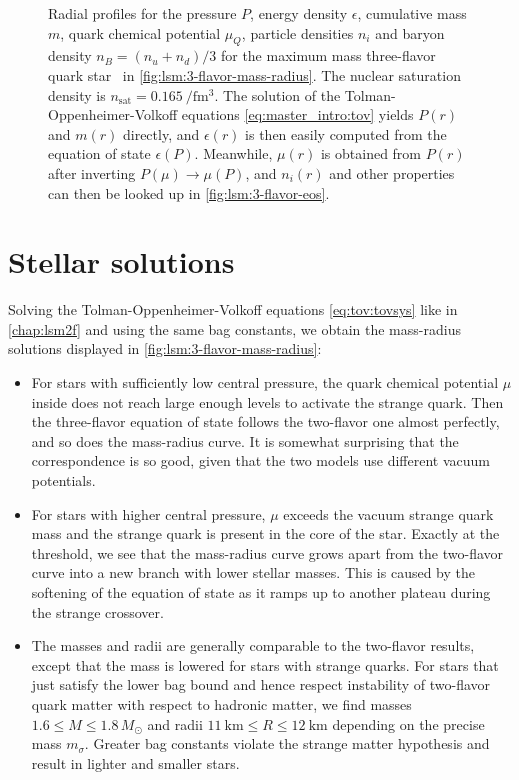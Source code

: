 \begin{figure}[p]
\begin{tikzpicture}
\end{tikzpicture}
\caption{\label{fig:lsm:3-flavor-star}%
	Radial profiles for the
	pressure $P$,
	energy density $\epsilon$,
	cumulative mass $m$,
	quark chemical potential $\mu_Q$,
	particle densities $n_i$
	and baryon density $n_B = (n_u+n_d)/3$
	for the maximum mass three-flavor quark star \goldenstar in \cref{fig:lsm:3-flavor-mass-radius}.
	The nuclear saturation density is $n_\text{sat} = \SI{0.165}{\per\femto\meter\cubed}$.
	The solution of the Tolman-Oppenheimer-Volkoff equations \eqref{eq:master_intro:tov} yields $P(r)$ and $m(r)$ directly,
	and $\epsilon(r)$ is then easily computed from the equation of state $\epsilon(P)$.
	Meanwhile, $\mu(r)$ is obtained from $P(r)$ after inverting $P(\mu) \rightarrow \mu(P)$,
	and $n_i(r)$ and other properties can then be looked up in \cref{fig:lsm:3-flavor-eos}.
}

\end{figure}

\section{Stellar solutions}

Solving the Tolman-Oppenheimer-Volkoff equations \eqref{eq:tov:tovsys} like in \cref{chap:lsm2f} and using the same bag constants,
we obtain the mass-radius solutions displayed in \cref{fig:lsm:3-flavor-mass-radius}:
\begin{itemize}
\item For stars with sufficiently low central pressure,
      the quark chemical potential $\mu$ inside does not reach large enough levels to activate the strange quark.
      Then the three-flavor equation of state follows the two-flavor one almost perfectly, and so does the mass-radius curve.
      It is somewhat surprising that the correspondence is so good, given that the two models use different vacuum potentials.
\item For stars with higher central pressure, $\mu$ exceeds the vacuum strange quark mass and the strange quark is present in the core of the star.
      Exactly at the threshold, we see that the mass-radius curve grows apart from the two-flavor curve into a new branch with lower stellar masses.
      This is caused by the softening of the equation of state as it ramps up to another plateau during the strange crossover.
\item The masses and radii are generally comparable to the two-flavor results, except that the mass is lowered for stars with strange quarks.
      For stars that just satisfy the lower bag bound and hence respect instability of two-flavor quark matter with respect to hadronic matter,
      we find masses $1.6 \leq M \leq 1.8 \, M_\odot$ and radii $\SI{11}{\kilo\meter} \leq R \leq \SI{12}{\kilo\meter}$ depending on the precise mass $m_\sigma$.
      Greater bag constants violate the strange matter hypothesis and result in lighter and smaller stars.
\end{itemize}

